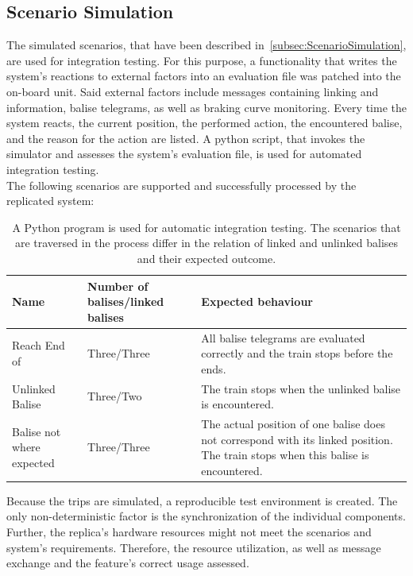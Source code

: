 \subsection{Scenario Simulation}
The simulated scenarios, that have been described in~\autoref{subsec:ScenarioSimulation}, are used for integration testing.
For this purpose, a functionality that writes the system's reactions to external factors into an evaluation file was patched into the on-board unit.
Said external factors include  messages containing linking and  information, balise telegrams, as well as braking curve monitoring.
Every time the system reacts, the current position, the performed action, the encountered balise, and the reason for the action are listed.
A python script, that invokes the simulator and assesses the system's evaluation file, is used for automated integration testing.
\\

The following scenarios are supported and successfully processed by the replicated system:

\begin{table}[h!]
	\begin{center}
		\caption{A Python program is used for automatic integration testing. The scenarios that are traversed in the process differ in the relation of linked and unlinked balises and their expected outcome.}
		\label{tab:stateQOS}
		\begin{tabularx}{\textwidth}{|X|X|X|}
			\hline
			\textbf{Name} & \textbf{Number of balises/linked balises} & \textbf{Expected behaviour}\\
			\hline \hline
			Reach End of \abr{MA} & Three/Three & All balise telegrams are evaluated correctly and the train stops before the \abr{MA} ends. \\
			\hline
			Unlinked Balise & Three/Two & The train stops when the unlinked balise is encountered. \\
			\hline
			Balise not where expected & Three/Three & The actual position of one balise does not correspond with its linked position. The train stops when this balise is encountered. \\
			\hline
		\end{tabularx}
	\end{center}
\end{table}

Because the trips are simulated, a reproducible test environment is created.
The only non-deterministic factor is the synchronization of the individual components.
Further, the replica's hardware resources might not meet the scenarios and system's requirements. 
Therefore, the resource utilization, as well as message exchange and the  feature's correct usage assessed.

